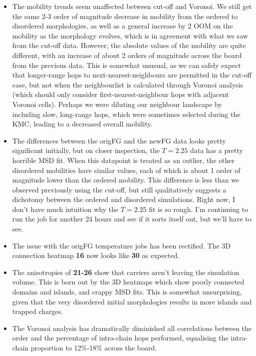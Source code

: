 \documentclass[12pt]{article}
\begin{document}
\begin{itemize}
    \item{The mobility trends seem unaffected between cut-off and Voronoi.
            We still get the same 2-3 order of magnitude decrease in mobility from the ordered to disordered morphologies, as well as a general increase by 2 OOM on the mobility as the morphology evolves, which is in agreement with what we saw from the cut-off data.
            However, the absolute values of the mobility are quite different, with an increase of about 2 orders of magnitude across the board from the previous data.
            This is somewhat unusual, as we can safely expect that longer-range hops to next-nearest-neighbours are permitted in the cut-off case, but not when the neighbourlist is calculated through Voronoi analysis (which should only consider first-nearest-neighbour hops with adjacent Voronoi cells).
            Perhaps we were diluting our neighbour landscape by including slow, long-range hops, which were sometimes selected during the KMC, leading to a decreased overall mobility.
        }
    \item{The differences between the origFG and the newFG data looks pretty significant initially, but on closer inspection, the $T = 2.25$ data has a pretty horrible MSD fit.
            When this datapoint is treated as an outlier, the other disordered mobilities have similar values, each of which is about 1 order of magnitude lower than the ordered mobility.
            This difference is less than we observed previously using the cut-off, but still qualitatively suggests a dichotomy between the ordered and disordered simulations.
        Right now, I don't have much intuition why the $T = 2.25$ fit is so rough.
    I'm continuing to run the job for another 24 hours and see if it sorts itself out, but we'll have to see.}
    \item{The issue with the origFG temperature jobs has been rectified.
        The 3D connection heatmap \textbf{16} now looks like \textbf{30} as expected.}
\item{The anisotropies of \textbf{21-26} show that carriers aren't leaving the simulation volume.
    This is born out by the 3D heatmaps which show poorly connected domains and islands, and crappy MSD fits.
    This is somewhat unsurprising, given that the very disordered initial morphologies results in more islands and trapped charges.
}
\item{The Voronoi analysis has dramatically diminished all correlations between the order and the percentage of intra-chain hops performed, equalising the intra-chain proportion to 12\%-18\% across the board.
}
\end{itemize}
\end{document}
